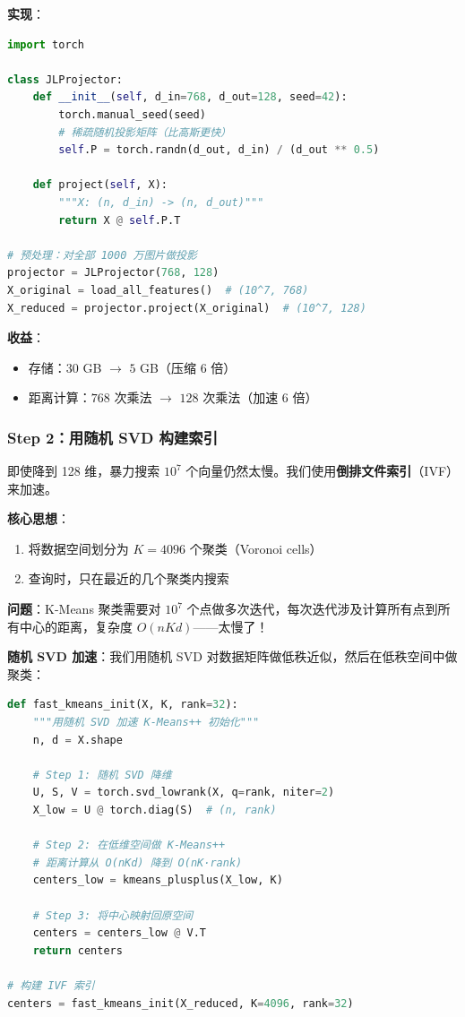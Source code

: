 \documentclass[11pt,a4paper]{ctexart}
\theoremstyle{definition}
\theoremstyle{remark}
\begin{document}
\textbf{实现}：
\begin{lstlisting}[language=Python]
import torch

class JLProjector:
    def __init__(self, d_in=768, d_out=128, seed=42):
        torch.manual_seed(seed)
        # 稀疏随机投影矩阵（比高斯更快）
        self.P = torch.randn(d_out, d_in) / (d_out ** 0.5)
    
    def project(self, X):
        """X: (n, d_in) -> (n, d_out)"""
        return X @ self.P.T

# 预处理：对全部 1000 万图片做投影
projector = JLProjector(768, 128)
X_original = load_all_features()  # (10^7, 768)
X_reduced = projector.project(X_original)  # (10^7, 128)
\end{lstlisting}

\textbf{收益}：
\begin{itemize}
    \item 存储：$30$ GB $\to$ $5$ GB（压缩 6 倍）
    \item 距离计算：$768$ 次乘法 $\to$ $128$ 次乘法（加速 6 倍）
\end{itemize}

\subsubsection{Step 2：用随机 SVD 构建索引}

即使降到 128 维，暴力搜索 $10^7$ 个向量仍然太慢。我们使用\textbf{倒排文件索引}（IVF）来加速。

\textbf{核心思想}：
\begin{enumerate}
    \item 将数据空间划分为 $K = 4096$ 个聚类（Voronoi cells）
    \item 查询时，只在最近的几个聚类内搜索
\end{enumerate}

\textbf{问题}：K-Means 聚类需要对 $10^7$ 个点做多次迭代，每次迭代涉及计算所有点到所有中心的距离，复杂度 $O(nKd)$——太慢了！

\textbf{随机 SVD 加速}：我们用随机 SVD 对数据矩阵做低秩近似，然后在低秩空间中做聚类：

\begin{lstlisting}[language=Python]
def fast_kmeans_init(X, K, rank=32):
    """用随机 SVD 加速 K-Means++ 初始化"""
    n, d = X.shape
    
    # Step 1: 随机 SVD 降维
    U, S, V = torch.svd_lowrank(X, q=rank, niter=2)
    X_low = U @ torch.diag(S)  # (n, rank)
    
    # Step 2: 在低维空间做 K-Means++
    # 距离计算从 O(nKd) 降到 O(nK·rank)
    centers_low = kmeans_plusplus(X_low, K)
    
    # Step 3: 将中心映射回原空间
    centers = centers_low @ V.T
    return centers

# 构建 IVF 索引
centers = fast_kmeans_init(X_reduced, K=4096, rank=32)
\end{lstlisting}
\end{document}
